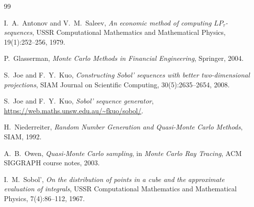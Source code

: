 \documentclass[11pt,a4paper]{article}
\theoremstyle{plain}
\theoremstyle{definition}
\theoremstyle{remark}
\begin{document}
\begin{thebibliography}{99}

I.\ A.\ Antonov and V.\ M.\ Saleev,
\emph{An economic method of computing $LP_\tau$-sequences},
USSR Computational Mathematics and Mathematical Physics,
19(1):252--256, 1979.

P.\ Glasserman,
\emph{Monte Carlo Methods in Financial Engineering},
Springer, 2004.

S.\ Joe and F.\ Y.\ Kuo,
\emph{Constructing Sobol' sequences with better two-dimensional
projections},
SIAM Journal on Scientific Computing, 30(5):2635--2654, 2008.

S.\ Joe and F.\ Y.\ Kuo,
\emph{Sobol' sequence generator},
\url{https://web.maths.unsw.edu.au/~fkuo/sobol/}.

H.\ Niederreiter,
\emph{Random Number Generation and Quasi-Monte Carlo Methods},
SIAM, 1992.

A.\ B.\ Owen,
\emph{Quasi-Monte Carlo sampling},
in \emph{Monte Carlo Ray Tracing}, ACM SIGGRAPH course notes, 2003.

I.\ M.\ Sobol',
\emph{On the distribution of points in a cube and the approximate
evaluation of integrals},
USSR Computational Mathematics and Mathematical Physics,
7(4):86--112, 1967.

\end{thebibliography}
\end{document}

